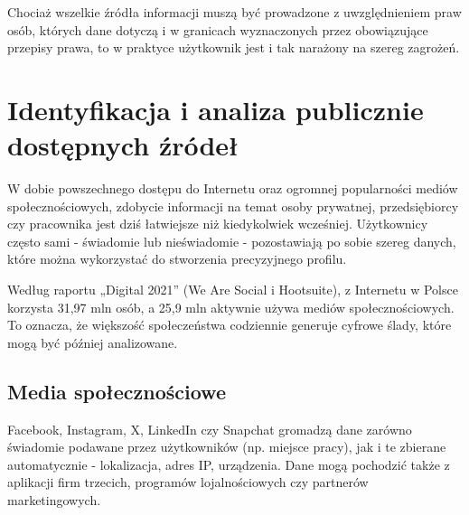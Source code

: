 Chociaż wszelkie źródła informacji muszą być prowadzone z uwzględnieniem praw osób, których dane dotyczą i w granicach wyznaczonych przez obowiązujące przepisy prawa, to w praktyce użytkownik jest i tak narażony na szereg zagrożeń.

\section{Identyfikacja i analiza publicznie dostępnych źródeł}

W dobie powszechnego dostępu do Internetu oraz ogromnej popularności mediów społecznościowych, zdobycie informacji na temat osoby prywatnej, przedsiębiorcy czy pracownika jest dziś łatwiejsze niż kiedykolwiek wcześniej. Użytkownicy często sami - świadomie lub nieświadomie - pozostawiają po sobie szereg danych, które można wykorzystać do stworzenia precyzyjnego profilu.

Według raportu „Digital 2021” (We Are Social i Hootsuite), z Internetu w Polsce korzysta 31,97 mln osób, a 25,9 mln aktywnie używa mediów społecznościowych. To oznacza, że większość społeczeństwa codziennie generuje cyfrowe ślady, które mogą być później analizowane.\cite{zrodlo}

\subsection{Media społecznościowe}

Facebook, Instagram, X, LinkedIn czy Snapchat gromadzą dane zarówno świadomie podawane przez użytkowników (np. miejsce pracy), jak i te zbierane automatycznie - lokalizacja, adres IP, urządzenia.
Dane mogą pochodzić także z aplikacji firm trzecich, programów lojalnościowych czy partnerów marketingowych.\cite{zrodlo2}

